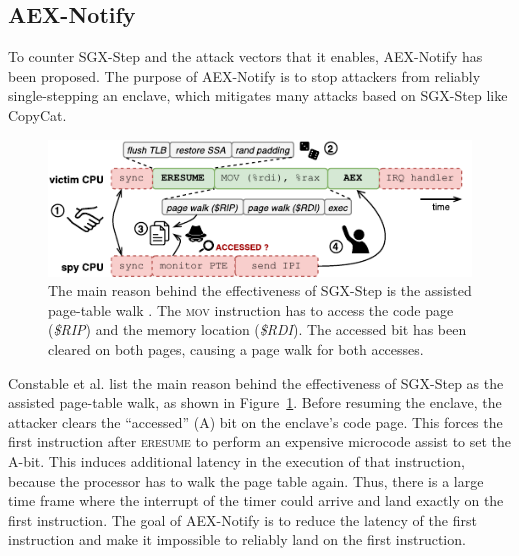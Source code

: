 \documentclass{llncs}
\begin{document}

\subsection{AEX-Notify}
\label{sec:aex-notify}

To counter SGX-Step and the attack vectors that it enables, AEX-Notify has been proposed.
The purpose of AEX-Notify is to stop attackers from reliably single-stepping an enclave,
which mitigates many attacks based on SGX-Step like CopyCat.

\begin{figure}
  \centering
  \includegraphics{images/sgx-step-pte.pdf}
  \caption{The main reason behind the effectiveness of SGX-Step is the assisted page-table walk \cite{ConstableBCXXAK23}.
    The \textsc{mov} instruction has to access the code page (\textsf{\itshape\$RIP}) and the memory location (\textsf{\itshape\$RDI}).
    The accessed bit has been cleared on both pages, causing a page walk for both accesses.}
  \label{fig:pte-walk}
\end{figure}

Constable et al. \cite{ConstableBCXXAK23} list the main reason behind the
effectiveness of SGX-Step as the assisted page-table walk, as shown in
Figure~\ref{fig:pte-walk}.
Before resuming the enclave, the attacker clears
the ``accessed'' (A) bit on the enclave's code page.
This forces the first instruction after \textsc{eresume}
to perform an expensive microcode assist to set the A-bit.
This induces additional latency in the execution of that instruction, because
the processor has to walk the page table again.
Thus, there is a large time frame where the interrupt of the timer could
arrive and land exactly on the first instruction.
The goal of AEX-Notify is to reduce the latency of the first instruction
and make it impossible to reliably land on the first instruction.
\end{document}
